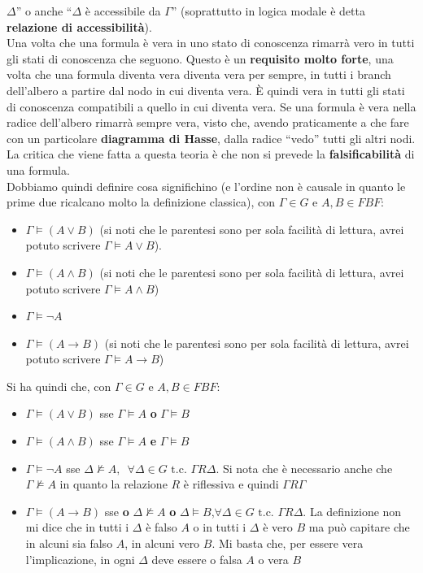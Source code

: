\documentclass[a4paper,12pt, oneside]{book}
\begin{document}
$\Delta$'' o anche  ``$\Delta$ è accessibile da $\Gamma$'' (soprattutto in
logica modale è detta \textbf{relazione di accessibilità}).\\
Una volta che una formula è vera in uno stato di conoscenza rimarrà
vero in tutti gli stati di conoscenza che seguono. Questo è un \textbf{requisito
  molto forte}, una volta che una formula diventa vera diventa vera per sempre,
in tutti i branch dell'albero a partire dal nodo in cui diventa vera. È quindi
vera in tutti gli stati di conoscenza compatibili a quello in cui diventa
vera. Se una formula è vera nella radice dell'albero rimarrà sempre vera, visto
che, avendo praticamente a che fare con un particolare \textbf{diagramma di
  Hasse}, dalla radice ``vedo'' tutti gli altri nodi.\\
La critica che viene fatta a questa teoria è che non si prevede la
\textbf{falsificabilità} di una formula. \\
Dobbiamo quindi definire cosa significhino (e l'ordine non è causale in quanto
le prime due ricalcano molto la definizione classica), con $\Gamma\in G$ e
$A,B\in FBF$: 
\begin{itemize}
  \item $\Gamma\vDash (A\lor B)$ (si noti che le parentesi sono per sola
  facilità di lettura, avrei potuto scrivere $\Gamma\vDash A\lor B$). 
  \item $\Gamma\vDash (A\land B)$ (si noti che le parentesi sono per sola
  facilità di lettura, avrei potuto scrivere $\Gamma\vDash A\land B$)
  \item $\Gamma\vDash \neg A$ 
  \item $\Gamma\vDash (A\to B)$ (si noti che le parentesi sono per sola
  facilità di lettura, avrei potuto scrivere $\Gamma\vDash A\to B$)
\end{itemize}
Si ha quindi che, con $\Gamma\in G$ e $A,B\in FBF$:
\begin{itemize}
  \item $\Gamma\vDash (A\lor B)$ sse $\Gamma\vDash A$ \textbf{o} $\Gamma\vDash
  B$  
  \item $\Gamma\vDash (A\land B)$ sse $\Gamma\vDash A$ \textbf{e} $\Gamma\vDash
  B$  
  \item $\Gamma\vDash \neg A$ sse $\Delta\nvDash A,\,\,\,\forall \Delta\in G
  \mbox{ t.c. } \Gamma R\Delta$. Si nota che è necessario anche che
  $\Gamma\nvDash A$ in quanto la relazione $R$ è riflessiva e quindi $\Gamma R
  \Gamma$ 
  \item $\Gamma\vDash (A\to B)$  sse \textbf{o} $\Delta\nvDash A$ \textbf{o}
  $\Delta\vDash B$,$\forall \Delta\in G \mbox{ t.c. } \Gamma R\Delta$. La
  definizione non mi dice che in tutti i $\Delta$ è falso $A$ o in tutti i
  $\Delta$ è vero $B$ ma può capitare che in alcuni sia falso $A$, in alcuni
  vero $B$. Mi basta che, per essere vera l'implicazione, in ogni $\Delta$ deve
  essere o falsa $A$ o vera $B$
\end{itemize}
\end{document}
